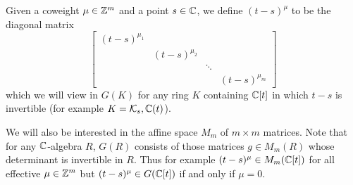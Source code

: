 \documentclass[draft]{article}
\begin{document}
Given a coweight $\mu \in \mathbb Z^m$ and a point $ s\in \mathbb C$, we define $ (t-s)^\mu$ to be the diagonal matrix 
\[
\begin{bmatrix}
    (t-s)^{\mu_1} \\
    & (t-s)^{\mu_2} \\ 
    & & \ddots \\
    & & & (t-s)^{\mu_m}
\end{bmatrix} 
\]
which we will view in 
$G(K)$ for any ring $ K $ containing $\mathbb C[t]$ in which $t-s$ is invertible (for example $ K = \mathcal K_s, \mathbb C(t)$). %


We will also be interested in the affine space $ M_m$ of $m\times m$ matrices.  Note that for any $ \mathbb C$-algebra $ R $, 
$G(R)$ consists of those matrices $ g \in M_m(R) $ whose determinant is invertible in $ R$. Thus for example $ (t-s)^\mu\in M_m(\mathbb C[t])$ for all effective $ \mu \in \mathbb Z^m$ but 
$(t-s)^\mu\in G(\mathbb C[t])$ if and only if $ \mu = 0 $.
% 
\end{document}
